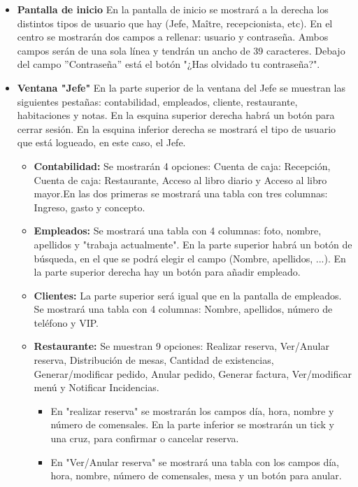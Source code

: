 \documentclass[spanish,a4paper,12pt]{report}	%
\begin{document}
			\begin{itemize}
				\item \textbf{Pantalla de inicio} En la pantalla de inicio se mostrará a la derecha los distintos tipos de usuario que hay (Jefe, Maître, recepcionista, etc). En el centro se mostrarán dos campos a rellenar: usuario y contraseña. Ambos campos serán de una sola línea y tendrán un ancho de 39 caracteres. Debajo del campo ''Contraseña'' está el botón "¿Has olvidado tu contraseña?".
				\item \textbf{Ventana "Jefe"} En la parte superior de la ventana del Jefe se muestran las siguientes pestañas: contabilidad, empleados, cliente, restaurante, habitaciones y notas. En la esquina superior derecha habrá un botón para cerrar sesión. En la esquina inferior derecha se mostrará el tipo de usuario que está logueado, en este caso, el Jefe. 
				\begin{itemize}
					\item \textbf{Contabilidad: }Se mostrarán 4 opciones: Cuenta de caja: Recepción, Cuenta de caja: Restaurante, Acceso al libro diario y Acceso al libro mayor.En las dos primeras se mostrará una tabla con tres columnas: Ingreso, gasto y concepto.
					 \item \textbf{Empleados: }Se mostrará una tabla con 4 columnas: foto, nombre, apellidos y "trabaja actualmente". En la parte superior habrá un botón de búsqueda, en el que se podrá elegir el campo (Nombre, apellidos, ...).
						En la parte superior derecha hay un botón para añadir empleado. 
					 \item \textbf{Clientes: }La parte superior será igual que en la pantalla de empleados. Se mostrará una tabla con 4 columnas: Nombre, apellidos, número de teléfono y VIP. 
					 \item \textbf{Restaurante: }Se muestran 9 opciones: Realizar reserva, Ver/Anular reserva, Distribución de mesas, Cantidad de existencias, Generar/modificar pedido, Anular pedido, Generar factura, Ver/modificar menú y Notificar Incidencias.
					\begin{itemize}
						\item En "realizar reserva" se mostrarán los campos día, hora, nombre y número de comensales. En la parte inferior se mostrarán un tick y una cruz, para confirmar o cancelar reserva. 
						\item En "Ver/Anular reserva" se mostrará una tabla con los campos día, hora, nombre, número de comensales, mesa y un botón para anular. 

\end{itemize}
\end{itemize}
\end{itemize}
\end{document}
